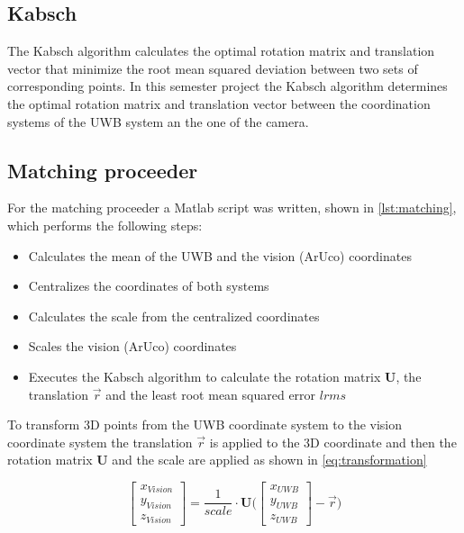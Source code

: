 \subsection{Kabsch}
The Kabsch algorithm \cite{Kabsch:a12999} calculates the optimal rotation matrix and translation vector that minimize the root mean squared deviation between two sets of corresponding points. In this semester project the Kabsch algorithm determines the optimal rotation matrix and translation vector between the coordination systems of the \ac{UWB} system an the one of the camera.

\subsection{Matching proceeder}\label{subsec:matching}
For the matching proceeder a Matlab script was written, shown in \autoref{lst:matching}, which performs the following steps:
\begin{itemize}
	\item Calculates the mean of the \ac{UWB} and the vision (ArUco) coordinates
	\item Centralizes the coordinates of both systems
	\item Calculates the scale from the centralized coordinates
	\item Scales the vision (ArUco) coordinates
	\item Executes the Kabsch algorithm to calculate the rotation matrix $\textbf{U}$, the translation $\vec r$ and the least root mean squared error $\mathit{lrms}$
\end{itemize}

To transform 3D points from the \ac{UWB} coordinate system to the vision coordinate system the translation $\vec r$ is applied to the 3D coordinate and then the rotation matrix $\textbf{U}$ and the scale are applied as shown in \autoref{eq:transformation}

\begin{equation}\label{eq:transformation}
	\begin{bmatrix}
		x_{\textit{Vision}} \\
		y_{\textit{Vision}} \\
		z_{\textit{Vision}}
	\end{bmatrix} = \frac{1}{\mathit{scale}} \cdot \textbf{U}
	\Bigg( \begin{bmatrix}
		x_{\textit{UWB}} \\
		y_{\textit{UWB}} \\
		z_{\textit{UWB}}
	\end{bmatrix} - \vec r \Bigg)
\end{equation}

